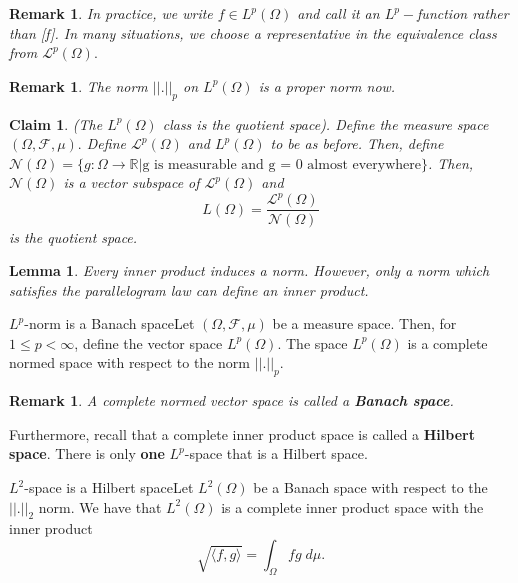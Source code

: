 \documentclass[twoside]{article}
\newtheorem{lemma}[theorem]{Lemma}
\newtheorem{claim}[theorem]{Claim}
\newtheorem{remark}[theorem]{Remark}
\newcommand{\sigmalgebra}{\mathcal{F}}
\begin{document}
\begin{remark}In practice, we write $f \in L^p(\Omega)$ and call it an $L^p-$function rather than [f]. In many situations, we choose a representative in the equivalence class from $\mathcal{L}^p(\Omega).$
\end{remark}

\begin{remark}The norm $||.||_p$ on $L^p(\Omega)$ is a proper norm now.
\end{remark}

\begin{claim}(The $L^p(\Omega)$ class is the quotient space). Define the measure space $(\Omega, \sigmalgebra, \mu).$ Define $\mathcal{L}^p(\Omega)$ and $L^p(\Omega)$ to be as before. Then, define $\mathcal{N}(\Omega) = \{g: \Omega \rightarrow \mathbb{R}| \text{g is measurable and g = 0 almost everywhere}\}$. Then, $\mathcal{N}(\Omega)$ is a vector subspace of $\mathcal{L}^p(\Omega)$ and 
$$
L(\Omega) = \frac{\mathcal{L}^p(\Omega)}{\mathcal{N}(\Omega)}
$$
is the quotient space.
\end{claim}

\begin{lemma}Every inner product induces a norm. However, only a norm which satisfies the parallelogram law can define an inner product.
\end{lemma}

\begin{theorem_exam}{$L^p$-norm is a Banach space}{}Let $(\Omega, \sigmalgebra, \mu)$ be a measure space. Then, for $1 \leq p < \infty$, define the vector space $L^p(\Omega).$ The space $L^p(\Omega)$ is a complete normed space with respect to the norm $||.||_p.$
\end{theorem_exam}

\begin{remark}A complete normed vector space is called a \textbf{Banach space}.
\end{remark}

Furthermore, recall that a complete inner product space is called a \textbf{Hilbert space}. There is only \textbf{one} $L^p$-space that is a Hilbert space.

\begin{proposition_exam}{$L^2$-space is a Hilbert space}{}Let $L^2(\Omega)$ be a Banach space with respect to the $||.||_2$ norm. We have that $L^2(\Omega)$ is a complete inner product space with the inner product 
$$
\sqrt{\langle f, g \rangle} = \int_{\Omega}fg\;d\mu.
$$
\end{proposition_exam}
\end{document}
